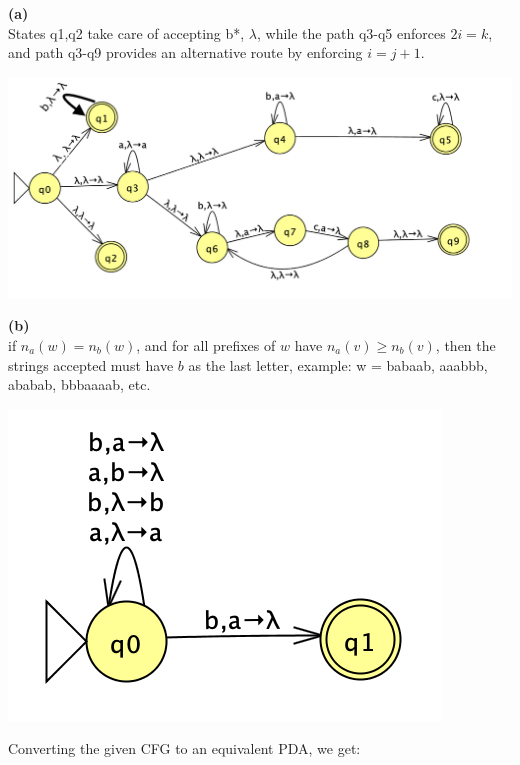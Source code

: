 \documentclass{homework}
\begin{document}
\maketitle

\question
\textbf{(a)}\\
States q1,q2 take care of accepting b*, $\lambda$, while the path q3-q5 enforces $2i=k$, and path q3-q9 provides an alternative route by enforcing $i=j+1$.
\begin{center}
\includegraphics{a8_1.png}\\
\end{center}
\textbf{(b)}\\
if $n_a(w) = n_b(w)$, and for all prefixes of $w$ have $n_a(v) \geq n_b(v)$, then the strings accepted must have $b$ as the last letter, example: w = babaab, aaabbb, ababab, bbbaaaab, etc.
\begin{center}
\includegraphics{a8_2.png}\\
\end{center}
\question
Converting the given CFG to an equivalent PDA, we get:
\end{document}
